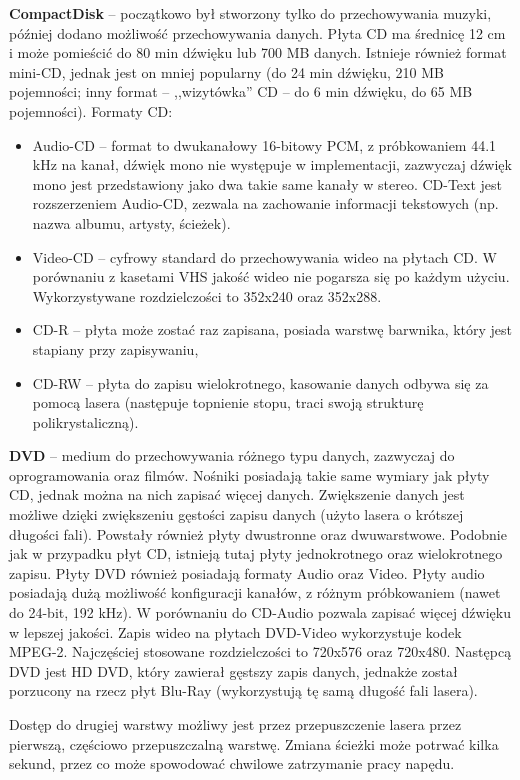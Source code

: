 \textbf{CompactDisk} -- początkowo był stworzony tylko do przechowywania muzyki, później dodano możliwość przechowywania danych. Płyta CD ma średnicę 12 cm i może pomieścić do 80 min dźwięku lub 700 MB danych. Istnieje również format mini-CD, jednak jest on mniej popularny (do 24 min dźwięku, 210 MB pojemności; inny format -- ,,wizytówka'' CD -- do 6 min dźwięku, do 65 MB pojemności). Formaty CD:
\begin{itemize}
\item Audio-CD -- format to dwukanałowy 16-bitowy PCM, z próbkowaniem 44.1 kHz na kanał, dźwięk mono nie występuje w implementacji, zazwyczaj dźwięk mono jest przedstawiony jako dwa takie same kanały w stereo. CD-Text jest rozszerzeniem Audio-CD, zezwala na zachowanie informacji tekstowych (np. nazwa albumu, artysty, ścieżek).
\item Video-CD -- cyfrowy standard do przechowywania wideo na płytach CD. W porównaniu z kasetami VHS jakość wideo nie pogarsza się po każdym użyciu. Wykorzystywane rozdzielczości to 352x240 oraz 352x288.
\item CD-R -- płyta może zostać raz zapisana, posiada warstwę barwnika, który jest stapiany przy zapisywaniu,
\item CD-RW -- płyta do zapisu wielokrotnego, kasowanie danych odbywa się za pomocą lasera (następuje topnienie stopu, traci swoją strukturę polikrystaliczną).
\end{itemize}

\textbf{DVD} -- medium do przechowywania różnego typu danych, zazwyczaj do oprogramowania oraz filmów. Nośniki posiadają takie same wymiary jak płyty CD, jednak można na nich zapisać więcej danych. Zwiększenie danych jest możliwe dzięki zwiększeniu gęstości zapisu danych (użyto lasera o krótszej długości fali). Powstały również płyty dwustronne oraz dwuwarstwowe. Podobnie jak w przypadku płyt CD, istnieją tutaj płyty jednokrotnego oraz wielokrotnego zapisu. Płyty DVD również posiadają formaty Audio oraz Video. Płyty audio posiadają dużą możliwość konfiguracji kanałów, z różnym próbkowaniem (nawet do 24-bit, 192 kHz). W porównaniu do CD-Audio pozwala zapisać więcej dźwięku w lepszej jakości. Zapis wideo na płytach DVD-Video wykorzystuje kodek MPEG-2. Najczęściej stosowane rozdzielczości to 720x576 oraz 720x480. Następcą DVD jest HD DVD, który zawierał gęstszy zapis danych, jednakże został porzucony na rzecz płyt Blu-Ray (wykorzystują tę samą długość fali lasera).

Dostęp do drugiej warstwy możliwy jest przez przepuszczenie lasera przez pierwszą, częściowo przepuszczalną warstwę. Zmiana ścieżki może potrwać kilka sekund, przez co może spowodować chwilowe zatrzymanie pracy napędu.

